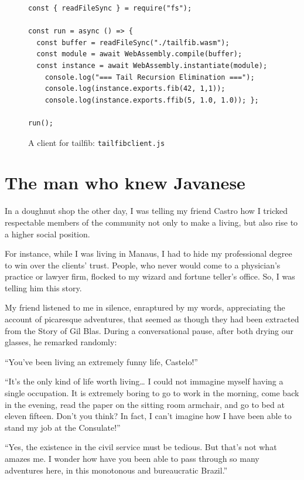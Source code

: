\documentclass[a4paper,12pt]{book}
\begin{document}
\begin{figure}[!h]
\begin{verbatim}
const { readFileSync } = require("fs");

const run = async () => {
  const buffer = readFileSync("./tailfib.wasm");
  const module = await WebAssembly.compile(buffer);
  const instance = await WebAssembly.instantiate(module);
    console.log("=== Tail Recursion Elimination ===");
    console.log(instance.exports.fib(42, 1,1));
    console.log(instance.exports.ffib(5, 1.0, 1.0)); };

run();
\end{verbatim}
  \caption{A client for tailfib: {\tt tailfibclient.js}}
  \label{wasm:tailfibclient}
\end{figure}






\chapter{The man who knew Javanese}
In a doughnut shop the other day,
I was telling my friend Castro
how I tricked respectable members of the
community not only to make a living,
but also rise to a higher social position.

For instance, while I was living in Manaus,
I had to hide my professional degree to win
over the clients' trust. People, who never would
come to a physician's practice or lawyer firm,
flocked to my wizard and fortune teller's office.
So, I was telling him this story.

My friend listened to me in silence,
enraptured by my words,
appreciating the account of picaresque adventures,
that seemed as though they had been
extracted from the Story of Gil Blas.
During a conversational pause,
after both drying our glasses,
he remarked randomly:

``You've been living an extremely funny life, Castelo!''

``It's the only kind of life worth living\ldots
I could not immagine
myself having a single occupation.
It is extremely boring
to go to work in the morning,
come back in the evening, read the paper
on the sitting room armchair,
and go to bed at eleven fifteen.
Don't you think?
In fact, I can't imagine how I have been
able to stand my job at the Consulate!''


``Yes, the existence in the civil service
must be tedious. But that's not
what amazes me. I wonder how have you been
able to pass through so many adventures here,
in this monotonous and bureaucratic Brazil.''
\end{document}
